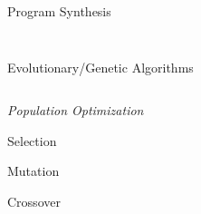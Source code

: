 \documentclass[aspectratio=169]{beamer}
\makeatletter
\newcommand{\white}[1]{{\color{pureminimalistic@text@white} #1}}
\newcommand{\cb}[1]{{\color{c2} #1}}
\makeatother
\begin{document}
\begin{frame}[plain]{\white{Program Synthesis}}
\begin{columns}[T]
\begin{column}{.5\linewidth}
\begin{figure}
          \end{figure}
      \end{column}
  \end{columns}
\end{frame}

\begin{frame}{Evolutionary/Genetic Algorithms}
  \begin{columns}[T]
      \begin{column}{.4\linewidth}
      \Huge \textit{\cb{Population Optimization}}
      \begin{vfilleditems}
          \item \Huge Selection
          \item \Huge Mutation
          \item \Huge Crossover
      \end{vfilleditems}
      \end{column}
      \begin{column}{.6\linewidth}
          \begin{figure}
              \centering

\end{figure}
\end{column}
\end{columns}
\end{frame}
\end{document}
